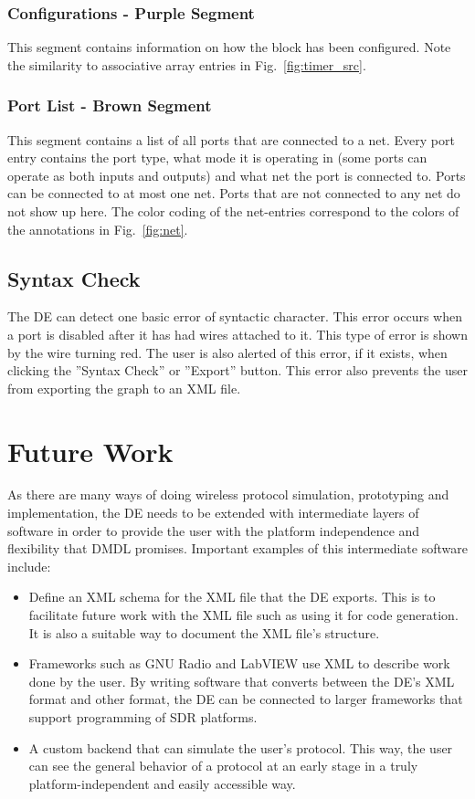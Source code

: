 \documentclass[journal,comsoc]{IEEEtran}
\begin{document}
\subsubsection{Configurations - Purple Segment}
This segment contains information on how the block has been configured. Note
the similarity to associative array entries in Fig.~\ref{fig:timer_src}.

\subsubsection{Port List - Brown Segment}
This segment contains a list of all ports that are connected to a net. Every port entry contains
the port type, what mode it is operating in (some ports can operate as both inputs and outputs)
and what net the port is connected to. Ports can be connected to at most one net. Ports that
are not connected to any net do not show up here. The color coding of the net-entries correspond
to the colors of the annotations in Fig.~\ref{fig:net}.

\subsection{Syntax Check}
\label{sec:syntax}
The DE can detect one basic error of syntactic character. This error occurs when a port is
disabled after it has had wires attached to it. This type of error is shown by the wire turning
red. The user is also alerted of this error, if it exists, when clicking the ''Syntax Check''
or ''Export'' button. This error also prevents the user from exporting the graph to an XML file.

\section{Future Work}
As there are many ways of doing wireless protocol simulation, prototyping and implementation, the
DE needs to be extended with intermediate layers of software in order to provide the user with
the platform independence and flexibility that DMDL promises. Important examples of this
intermediate software include:
\begin{itemize}
    \item Define an XML schema for the XML file that the DE exports. This is to facilitate
          future work with the XML file such as using it for code generation. It is also a
          suitable way to document the XML file's structure.
    \item Frameworks such as GNU Radio and LabVIEW use XML to describe work done by the user.
          By writing software that converts between the DE's XML format and other format, the
          DE can be connected to larger frameworks that support programming of SDR platforms.
    \item A custom backend that can simulate the user's protocol. This way, the user can
          see the general behavior of a protocol at an early stage in a truly
          platform-independent and easily accessible way.
\end{itemize}
\end{document}
